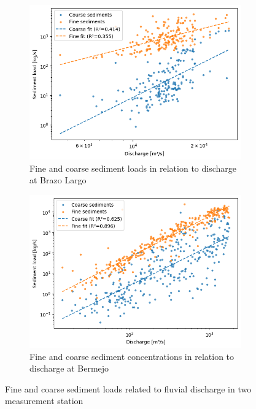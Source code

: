 \begin{figure}[h!]
    \centering
    \begin{subfigure}[b]{0.48\linewidth}
        \centering
        \includegraphics[width=\linewidth]{figures/ch5/discharge sediment brazo largo.png}
        \caption{Fine and coarse sediment loads in relation to discharge at Brazo Largo}
        \label{fig:discharge sediment brazo}
    \end{subfigure}
    \hfill
    \begin{subfigure}[b]{0.48\linewidth}
        \centering
        \includegraphics[width=\linewidth]{figures/ch5/discharge sediment bermejo.png}
        \caption{Fine and coarse sediment concentrations in relation to discharge at Bermejo}
        \label{fig:discharge sediment bermejo}
    \end{subfigure}
    
    \caption{Fine and coarse sediment loads related to fluvial discharge in two measurement station}
    \label{fig:sediment loads and discharge}
\end{figure}


